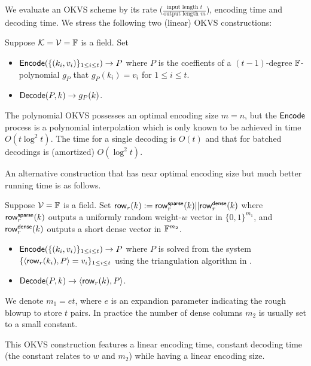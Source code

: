 We evaluate an OKVS scheme by its rate ($\frac{\text{input length }t}{\text{output length }m}$), encoding time and decoding time. We stress the following two (linear) OKVS constructions:
\begin{construction}[Polynomial]\label{con:OKVS_polynomial}
  Suppose $\mathcal{K} = \mathcal{V}=\mathbb{F}$ is a field. Set 
  \begin{itemize}
    \item ${\sf Encode}(\{(k_i,v_i)\}_{1\le i\le t}) \rightarrow P$ where $P$ is the coeffients of a $(t-1)$-degree $\mathbb{F}$-polynomial $g_P$ that $g_P(k_i) = v_i$ for $1\le i\le t$. 
    \item ${\sf Decode}(P,k)\rightarrow g_P(k)$. 
  \end{itemize}
\end{construction}
The polynomial OKVS possesses an optimal encoding size $m=n$, but the ${\sf Encode}$ process is a polynomial interpolation which is only known to be achieved in time $O(t\log^2t)$. The time for a single decoding is $O(t)$ and that for batched decodings is (amortized) $O(\log^2 t)$. 

An alternative construction that has near optimal encoding size but much better running time is as follows. 
\begin{construction}\label{con:OKVS_sparse_matrix}
  Suppose $\mathcal{V}=\mathbb{F}$ is a field. Set ${\sf row}_r(k):={\sf row}_r^{\sf sparse}(k)||{\sf row}_r^{\sf dense}(k)$ where ${\sf row}_r^{\sf sparse}(k)$ outputs a uniformly random weight-$w$ vector in $\{0,1\}^{m_1}$, and ${\sf row}_r^{\sf dense}(k)$ outputs a short dense vector in $\mathbb{F}^{m_2}$. 
  \begin{itemize}
    \item ${\sf Encode}(\{(k_i,v_i)\}_{1\le i\le t}) \rightarrow P$ where $P$ is solved from the system $\{\langle {\sf row}_r(k_i), P \rangle = v_i\}_{1\le i\le t}$ using the triangulation algorithm in \cite{cryptoeprint:2022/320}. 
    \item ${\sf Decode}(P,k)\rightarrow \langle {\sf row}_r(k), P \rangle$. 
  \end{itemize}
  We denote $m_1=et$, where $e$ is an expandion parameter indicating the rough blowup to store $t$ pairs. In practice the number of dense columns $m_2$ is usually set to a small constant. 
\end{construction}
This OKVS construction features a linear encoding time, constant decoding time (the constant relates to $w$ and $m_2$) while having a linear encoding size. 

